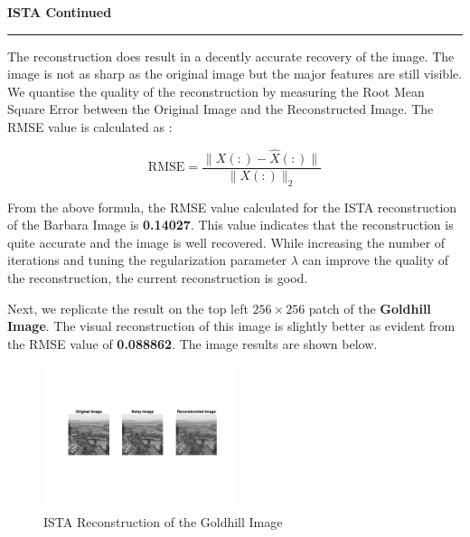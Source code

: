 \documentclass[a4paper,12pt]{article}
\newenvironment{solution}[2][]{%
    \begin{mdframed}[linecolor=blue!70!black, linewidth=2pt, roundcorner=10pt, backgroundcolor=yellow!10!white, skipabove=12pt, skipbelow=12pt]%
        \textbf{\large #2}
        \par\noindent\rule{\textwidth}{0.4pt}
}{
    \end{mdframed}
}
\begin{document}
\begin{solution}{ISTA Continued}
  The reconstruction does result in a decently accurate recovery of the image. The image is not as sharp as the original image but the major features are still visible. We quantise the quality of the reconstruction by measuring the Root Mean Square Error between the Original Image and the Reconstructed Image. The RMSE value is calculated as :

  \begin{equation}
    \text{RMSE} = \displaystyle\frac{\|X(:) - \hat{X}(:)\|}{\|X(:)\|_2}
  \end{equation}

  \noindent From the above formula, the RMSE value calculated for the ISTA reconstruction of the Barbara Image is \textbf{0.14027}. This value indicates that the reconstruction is quite accurate and the image is well recovered. While increasing the number of iterations and tuning the regularization parameter $\lambda$ can improve the quality of the reconstruction, the current reconstruction is good.

  \noindent Next, we replicate the result on the top left $256 \times 256$ patch of the \textbf{Goldhill Image}. The visual reconstruction of this image is slightly better as evident from the RMSE value of \textbf{0.088862}. The image results are shown below.
\end{solution}

\begin{figure}[!htbp]
  \centering
  \includegraphics[width=0.5\textwidth]{../ISTA_Goldhill.png}
  \caption{ISTA Reconstruction of the Goldhill Image}
\end{figure}
\end{document}
